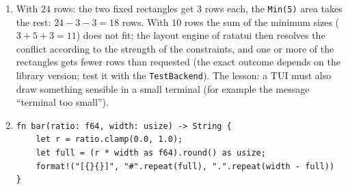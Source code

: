 \begin{enumerate}[label=\textbf{\ansnum.\arabic*}]
\begin{verbatim}
#[cfg(test)]
mod tests {
    use super::*;
    #[test]
    fn gap_then_reset() {
        let mut a = App::default();
        for seq in [1, 2, 3, 7, 8] {
            a.update(Msg::Packet { seq, pitch: 0.0 });
        }
        assert_eq!((a.rx_count, a.lost), (5, 3));
        a.update(Msg::Reset);
        assert_eq!((a.rx_count, a.lost, a.history.len()), (0, 0, 0));
    }
}
\end{verbatim}
The test passes (five packets counted, $3$ lost: $4,5,6$; after the reset everything is zero). Note that \verb!last_seq! is kept after a reset: the next packet must not be counted as a huge loss.
  \item With $24$ rows: the two fixed rectangles get $3$ rows each, the \verb!Min(5)! area takes the rest: $24-3-3=18$ rows. With $10$ rows the sum of the minimum sizes ($3+5+3=11$) does not fit; the layout engine of ratatui then resolves the conflict according to the strength of the constraints, and one or more of the rectangles gets fewer rows than requested (the exact outcome depends on the library version; test it with the \verb!TestBackend!). The lesson: a TUI must also draw something sensible in a small terminal (for example the message ``terminal too small'').
  \item
\begin{verbatim}
fn bar(ratio: f64, width: usize) -> String {
    let r = ratio.clamp(0.0, 1.0);
    let full = (r * width as f64).round() as usize;
    format!("[{}{}]", "#".repeat(full), ".".repeat(width - full))
}


\end{verbatim}
\end{enumerate}
